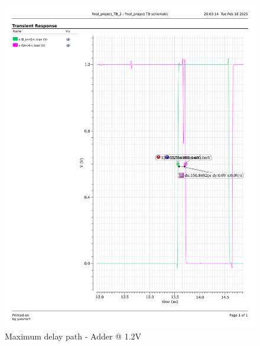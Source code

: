 \documentclass[a4paper,12pt]{article}
\begin{document}
\begin{figure}[H]
    \hfill
    \begin{minipage}{0.49\textwidth}
        \centering
        \includegraphics[width=\textwidth]{delay/CP_max1_add_1.2.pdf}
        \caption{Maximum delay path - Adder @ 1.2V}
    \end{minipage}
\end{figure}
\end{document}
